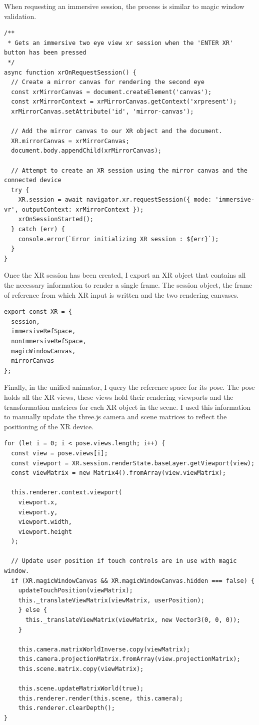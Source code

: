 \documentclass[onecolumn, draftclsnofoot,10pt, compsoc]{IEEEtran}
\begin{document}
    When requesting an immersive session, the process is similar to magic window validation.
    \begin{lstlisting}
/**
 * Gets an immersive two eye view xr session when the 'ENTER XR' button has been pressed
 */
async function xrOnRequestSession() {
  // Create a mirror canvas for rendering the second eye
  const xrMirrorCanvas = document.createElement('canvas');
  const xrMirrorContext = xrMirrorCanvas.getContext('xrpresent');
  xrMirrorCanvas.setAttribute('id', 'mirror-canvas');

  // Add the mirror canvas to our XR object and the document.
  XR.mirrorCanvas = xrMirrorCanvas;
  document.body.appendChild(xrMirrorCanvas);

  // Attempt to create an XR session using the mirror canvas and the connected device
  try {
    XR.session = await navigator.xr.requestSession({ mode: 'immersive-vr', outputContext: xrMirrorContext });
    xrOnSessionStarted();
  } catch (err) {
    console.error(`Error initializing XR session : ${err}`);
  }
}
    \end{lstlisting}
    
    Once the XR session has been created, I export an XR object that contains all the necessary information to render a single frame. The session object, the frame of reference from which XR input is written and the two rendering canvases.
    \begin{lstlisting}
export const XR = {
  session,
  immersiveRefSpace,
  nonImmersiveRefSpace,
  magicWindowCanvas,
  mirrorCanvas
};
    \end{lstlisting}
    
    Finally, in the unified animator, I query the reference space for its pose. The pose holds all the XR views, these views hold their rendering viewports and the transformation matrices for each XR object in the scene. I used this information to manually update the three.js camera and scene matrices to reflect the positioning of the XR device.
    \begin{lstlisting}
for (let i = 0; i < pose.views.length; i++) {
  const view = pose.views[i];
  const viewport = XR.session.renderState.baseLayer.getViewport(view);
  const viewMatrix = new Matrix4().fromArray(view.viewMatrix);

  this.renderer.context.viewport(
    viewport.x,
    viewport.y,
    viewport.width,
    viewport.height
  );

  // Update user position if touch controls are in use with magic window.
  if (XR.magicWindowCanvas && XR.magicWindowCanvas.hidden === false) {
    updateTouchPosition(viewMatrix);
    this._translateViewMatrix(viewMatrix, userPosition);
    } else {
      this._translateViewMatrix(viewMatrix, new Vector3(0, 0, 0));
    }

    this.camera.matrixWorldInverse.copy(viewMatrix);
    this.camera.projectionMatrix.fromArray(view.projectionMatrix);
    this.scene.matrix.copy(viewMatrix);

    this.scene.updateMatrixWorld(true);
    this.renderer.render(this.scene, this.camera);
    this.renderer.clearDepth();
}
    \end{lstlisting}
    
\end{document}
